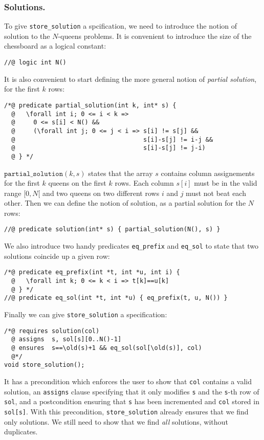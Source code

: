 \documentclass[a4paper]{llncs}
\begin{document}
\subsubsection{Solutions.}
To give \texttt{store\_solution} a spcification, we need to introduce
the notion of solution to the $N$-queens problems. It is convenient to
introduce the size of the chessboard as a logical constant:
\begin{verbatim}
//@ logic int N()
\end{verbatim}
It is also convenient to start defining the more general notion of
\emph{partial solution}, for the first $k$ rows:
\begin{verbatim}
/*@ predicate partial_solution(int k, int* s) {
  @   \forall int i; 0 <= i < k => 
  @     0 <= s[i] < N() &&
  @     (\forall int j; 0 <= j < i => s[i] != s[j] &&
  @                                   s[i]-s[j] != i-j &&
  @                                   s[i]-s[j] != j-i)
  @ } */
\end{verbatim}
$\mathtt{partial\_solution}(k,s)$ states that the array $s$ contains
column assignements for the first $k$ queens on the first $k$
rows. Each column $s[i]$ must be in the valid range $[0,N[$ and two
queens on two different rows $i$ and $j$ must not beat each other.
Then we can define the notion of solution, as a partial solution for
the $N$ rows:
\begin{verbatim}
//@ predicate solution(int* s) { partial_solution(N(), s) }
\end{verbatim}
We also introduce two handy predicates \texttt{eq\_prefix} and
\texttt{eq\_sol} to state that two solutions coincide up a given row:
\begin{verbatim}
/*@ predicate eq_prefix(int *t, int *u, int i) {
  @   \forall int k; 0 <= k < i => t[k]==u[k]
  @ } */
//@ predicate eq_sol(int *t, int *u) { eq_prefix(t, u, N()) } 
\end{verbatim}
Finally we can give \texttt{store\_solution} a specification:
\begin{verbatim}
/*@ requires solution(col)
  @ assigns  s, sol[s][0..N()-1]
  @ ensures  s==\old(s)+1 && eq_sol(sol[\old(s)], col)
  @*/
void store_solution();
\end{verbatim}
It has a precondition which enforces the user to show that
\texttt{col} contains a valid solution, an \texttt{assigns} clause
specifying that it only modifies \texttt{s} and the \texttt{s}-th row
of \texttt{sol}, and a postcondition ensuring that \texttt{s} has been
incremented and \texttt{col} stored in \verb!sol[s]!.
With this precondition, \texttt{store\_solution} already ensures that
we find only solutions. We still need to show that we find \emph{all}
solutions, without duplicates.
\end{document}
